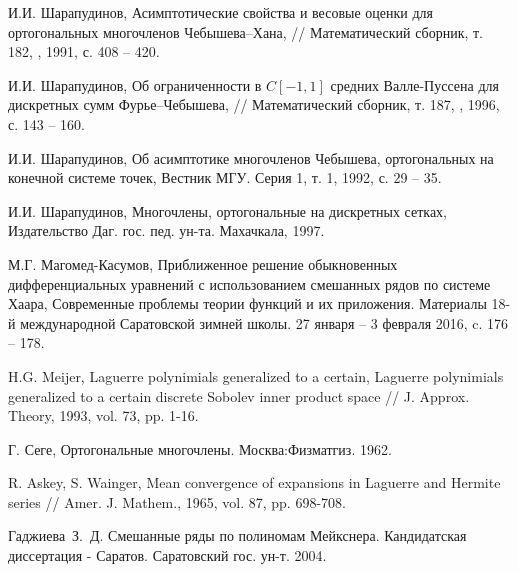 \begin{thebibliography}{999}


И.И. Шарапудинов,
Асимптотические свойства и весовые оценки для ортогональных многочленов Чебышева–Хана,
// Математический сборник, т. 182, , 1991, с. 408 -- 420.





И.И. Шарапудинов,
Об ограниченности в $C[-1,1]$ средних Валле-Пуссена для дискретных сумм Фурье–Чебышева,
// Математический сборник, т. 187, , 1996, с. 143 -- 160.






И.И. Шарапудинов,
Об асимптотике многочленов Чебышева, ортогональных на конечной системе точек,
Вестник МГУ. Серия 1, т. 1, 1992, с. 29 -- 35.





И.И. Шарапудинов,
Многочлены, ортогональные на дискретных сетках,
Издательство Даг. гос. пед. ун-та. Махачкала, 1997.





М.Г. Магомед-Касумов,
Приближенное решение обыкновенных дифференциальных уравнений с использованием смешанных рядов по системе Хаара,
Современные проблемы теории функций и их приложения. Материалы 18-й международной Саратовской зимней школы.  27 января -- 3 февраля 2016, c. 176 -- 178.





 H.G. Meijer, Laguerre polynimials generalized to a certain,  Laguerre polynimials generalized to a certain discrete Sobolev inner product space // J. Approx. Theory, 1993, vol. 73, pp. 1-16.




 Г. Сеге, Ортогональные многочлены. Москва:Физматгиз. 1962.




 R. Askey, S. Wainger, Mean convergence of expansions in Laguerre and Hermite series // Amer. J. Mathem., 1965, vol. 87, pp. 698-708.

%
%
%


Гаджиева~З.~Д. Смешанные ряды по полиномам Мейкснера. Кандидатская диссертация - Саратов. Саратовский гос. ун-т. 2004.



\end{thebibliography}
